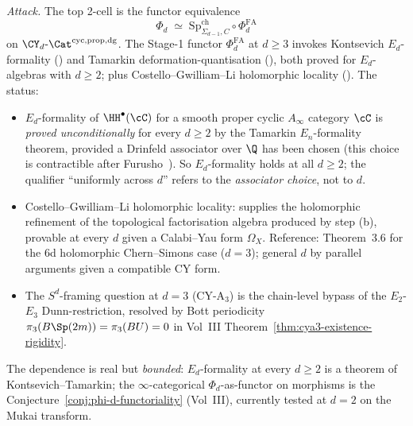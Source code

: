 \emph{Attack.} The top 2-cell is the functor equivalence
\[
 \Phi_d \;\simeq\; \mathrm{Sp}^{\mathrm{ch}}_{\Sigma_{d-1},C}
 \circ \Phi^{\mathrm{FA}}_d
\]
on $\CY_d\text{-}\Cat^{\mathrm{cyc,prop,dg}}$. The Stage-1 functor
$\Phi^{\mathrm{FA}}_d$ at $d\geq 3$ invokes Kontsevich $E_d$-formality
(\cite{Kontsevich1999}) and Tamarkin deformation-quantisation
(\cite{Tamarkin2007}), both proved for $E_d$-algebras with
$d\geq 2$; plus Costello--Gwilliam--Li holomorphic locality
(\cite{CostelloGwilliam2017,CostelloLi2016,CostelloLi2020}). The
status:
\begin{itemize}
 \item $E_d$-formality of $\HH^\bullet(\cC)$ for a smooth proper
 cyclic $A_\infty$ category $\cC$ is \emph{proved unconditionally}
 for every $d\geq 2$ by the Tamarkin $E_n$-formality theorem, provided
 a Drinfeld associator over $\Q$ has been chosen (this choice is
 contractible after Furusho~\cite{Furusho2010}). So $E_d$-formality
 holds at all $d\geq 2$; the qualifier ``uniformly across $d$'' refers
 to the \emph{associator choice}, not to $d$.
 \item Costello--Gwilliam--Li holomorphic locality: supplies the
 holomorphic refinement of the topological factorisation algebra
 produced by step (b), provable at every $d$ given a Calabi--Yau form
 $\Omega_X$. Reference: \cite{CostelloLi2020} Theorem~3.6 for the
 $6$d holomorphic Chern--Simons case ($d=3$); general $d$ by
 parallel arguments given a compatible CY form.
 \item The $S^d$-framing question at $d=3$ (CY-A$_3$) is the
 chain-level bypass of the $E_2$-$E_3$ Dunn-restriction, resolved by
 Bott periodicity $\pi_3(B\Sp(2m))=\pi_3(BU)=0$ in Vol~III
 Theorem~\ref{thm:cya3-existence-rigidity}.
\end{itemize}
The dependence is real but \emph{bounded}: $E_d$-formality at every
$d\geq 2$ is a theorem of Kontsevich--Tamarkin; the
$\infty$-categorical $\Phi_d$-as-functor on morphisms is the
Conjecture~\ref{conj:phi-d-functoriality} (Vol~III), currently tested
at $d=2$ on the Mukai transform.

